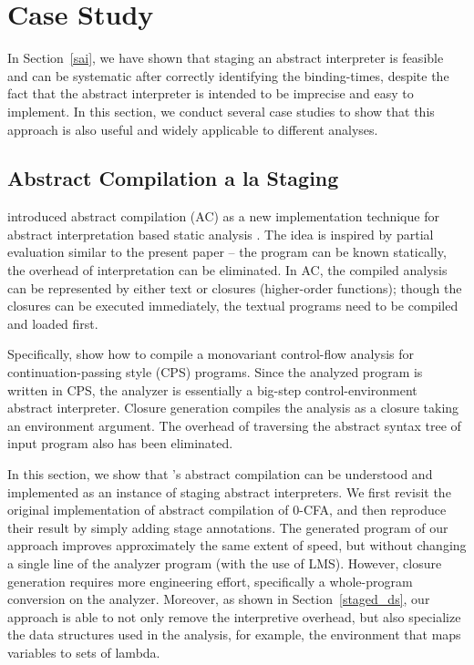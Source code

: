 \section{Case Study} \label{cases_study}

In Section~\ref{sai}, we have shown that staging an abstract interpreter is
feasible and can be systematic after correctly identifying the binding-times,
despite the fact that the abstract interpreter is intended to be imprecise and
easy to implement. In this section, we conduct several case studies to show that
this approach is also useful and widely applicable to different analyses.

\subsection{Abstract Compilation a la Staging} \label{cs_ac}

\citeauthor{Boucher:1996:ACN:647473.727587} introduced abstract compilation (AC)
as a new implementation technique for abstract interpretation based static
analysis \cite{Boucher:1996:ACN:647473.727587}. The idea is inspired by partial
evaluation similar to the present paper -- the program can be known statically,
the overhead of interpretation can be eliminated. In AC, the compiled analysis
can be represented by either text or closures (higher-order functions); though
the closures can be executed immediately, the textual programs need to be
compiled and loaded first.

Specifically, \citeauthor{Boucher:1996:ACN:647473.727587} show how to compile a
monovariant control-flow analysis \cite{Shivers:1991:SSC:115865.115884,
Shivers:1988:CFA:53990.54007} for continuation-passing style (CPS) programs.
Since the analyzed program is written in CPS, the analyzer is essentially a
big-step control-environment abstract interpreter. Closure generation compiles
the analysis as a closure taking an environment argument. The overhead of
traversing the abstract syntax tree of input program also has been eliminated.

In this section, we show that \citeauthor{Boucher:1996:ACN:647473.727587}'s
abstract compilation can be understood and implemented as an instance of staging
abstract interpreters. We first revisit the original implementation of abstract
compilation of 0-CFA, and then reproduce their result by simply adding stage
annotations. The generated program of our approach improves approximately the
same extent of speed, but without changing a single line of the analyzer program
(with the use of LMS). However, closure generation requires more engineering
effort, specifically a whole-program conversion on the analyzer. Moreover, as
shown in Section~\ref{staged_ds}, our approach is able to not only remove the
interpretive overhead, but also specialize the data structures used in the
analysis, for example, the environment that maps variables to sets of lambda.

